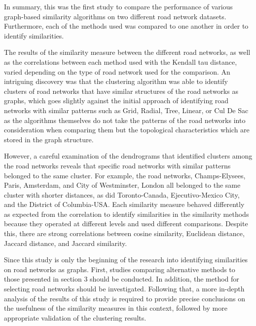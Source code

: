 
In summary, this was the first study to compare the performance of various graph-based similarity algorithms on two different road network datasets. Furthermore, each of the methods used was compared to one another in order to identify similarities.

The results of the similarity measure between the different road networks, as well as the correlations between each method used with the Kendall tau distance, varied depending on the type of road network used for the comparison. An intriguing discovery was that the clustering algorithm was able to identify clusters of road networks that have similar structures of the road networks as graphs, which goes slightly against the initial approach of identifying road networks with similar patterns such as Grid, Radial, Tree, Linear, or Cul De Sac as the algorithms themselves do not take the patterns of the road networks into consideration when comparing them but the topological characteristics which are stored in the graph structure.

However, a careful examination of the dendrograms that identified clusters among the road networks reveals that specific road networks with similar patterns belonged to the same cluster. For example, the road networks, Champs-Elysees, Paris, Amsterdam, and City of Westminster, London all belonged to the same cluster with shorter distances, as did Toronto-Canada, Ejecutivo-Mexico City, and the District of Columbia-USA. Each similarity measure behaved differently as expected from the correlation to identify similarities in the similarity methods because they operated at different levels and used different comparisons. Despite this, there are strong correlations between cosine similarity, Euclidean distance, Jaccard distance, and Jaccard similarity.

Since this study is only the beginning of the research into identifying similarities on road networks as graphs. First, studies comparing alternative methods to those presented in section 3 should be conducted. In addition, the method for selecting road networks should be investigated. Following that, a more in-depth analysis of the results of this study is required to provide precise conclusions on the usefulness of the similarity measures in this context, followed by more appropriate validation of the clustering results.


